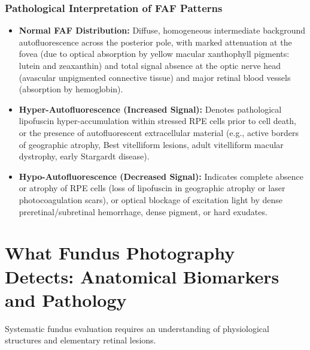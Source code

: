 \documentclass[11pt,a4paper]{article}
\begin{document}
\subsubsection{Pathological Interpretation of FAF Patterns}
\begin{itemize}[leftmargin=*]
    \item \textbf{Normal FAF Distribution:} Diffuse, homogeneous intermediate background autofluorescence across the posterior pole, with marked attenuation at the fovea (due to optical absorption by yellow macular xanthophyll pigments: lutein and zeaxanthin) and total signal absence at the optic nerve head (avascular unpigmented connective tissue) and major retinal blood vessels (absorption by hemoglobin).
    \item \textbf{Hyper-Autofluorescence (Increased Signal):} Denotes pathological lipofuscin hyper-accumulation within stressed RPE cells prior to cell death, or the presence of autofluorescent extracellular material (e.g., active borders of geographic atrophy, Best vitelliform lesions, adult vitelliform macular dystrophy, early Stargardt disease).
    \item \textbf{Hypo-Autofluorescence (Decreased Signal):} Indicates complete absence or atrophy of RPE cells (loss of lipofuscin in geographic atrophy or laser photocoagulation scars), or optical blockage of excitation light by dense preretinal/subretinal hemorrhage, dense pigment, or hard exudates.
\end{itemize}

\section{What Fundus Photography Detects: Anatomical Biomarkers and Pathology}

Systematic fundus evaluation requires an understanding of physiological structures and elementary retinal lesions.
\end{document}
